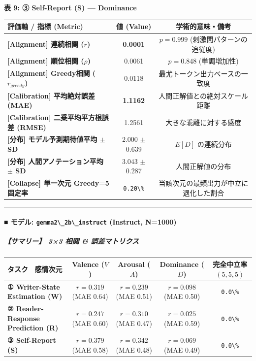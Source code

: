 \textbf{表 9: ③ Self-Report (S) — Dominance}
\begin{center}
\small
\begin{tabular}{lcc}
\toprule
\textbf{評価軸 / 指標 (Metric)} & \textbf{値 (Value)} & \textbf{学術的意味・備考} \\
\midrule
\textbf{[Alignment] 連続相関 ($r$)} & \textbf{0.0001} & $p = 0.999 $ (刺激間パターンの追従度) \\
\textbf{[Alignment] 順位相関 ($\rho$)} & 0.0061 & $p = 0.848 $ (単調増加性) \\
\textbf{[Alignment] Greedy相関 ($r_{greedy}$)} & 0.0118 & 最尤トークン出力ベースの一致度 \\
\textbf{[Calibration] 平均絶対誤差 (MAE)} & \textbf{1.1162} & 人間正解値との絶対スケール距離 \\
\textbf{[Calibration] 二乗平均平方根誤差 (RMSE)} & 1.2561 & 大きな乖離に対する感度 \\
\textbf{[分布] モデル予測期待値平均 $\pm$ SD} & 2.000 $\pm$ 0.639 & $E[D]$ の連続分布 \\
\textbf{[分布] 人間アノテーション平均 $\pm$ SD} & 3.043 $\pm$ 0.287 & 人間正解値の分布 \\
\textbf{[Collapse] 単一次元 Greedy=5 固定率} & \texttt{0.20\textbackslash{}\%} & 当該次元の最頻出力が中立に退化した割合 \\
\bottomrule
\end{tabular}
\end{center}


\vspace{0.5em}\hrule\vspace{0.5em}

\paragraph{■ モデル: \texttt{gemma2\textbackslash{}\_2b\textbackslash{}\_instruct} (Instruct, N=1000)}

\subparagraph{【サマリー】 3×3 相関 \& 誤差マトリクス}
\begin{center}
\small
\begin{tabular}{lcccc}
\toprule
\textbf{タスク \ 感情次元} & \textbf{Valence ($V$)} & \textbf{Arousal ($A$)} & \textbf{Dominance ($D$)} & \textbf{完全中立率 $(5,5,5)$} \\
\midrule
\textbf{① Writer-State Estimation (W)} & \textbf{$r=0.319$} (MAE 0.64) & \textbf{$r=0.239$} (MAE 0.51) & \textbf{$r=0.098$} (MAE 0.50) & \texttt{0.0\textbackslash{}\%} \\
\textbf{② Reader-Response Prediction (R)} & \textbf{$r=0.247$} (MAE 0.60) & \textbf{$r=0.310$} (MAE 0.47) & \textbf{$r=0.025$} (MAE 0.59) & \texttt{0.0\textbackslash{}\%} \\
\textbf{③ Self-Report (S)} & \textbf{$r=0.379$} (MAE 0.58) & \textbf{$r=0.342$} (MAE 0.48) & \textbf{$r=0.069$} (MAE 0.49) & \texttt{0.0\textbackslash{}\%} \\
\bottomrule
\end{tabular}
\end{center}


